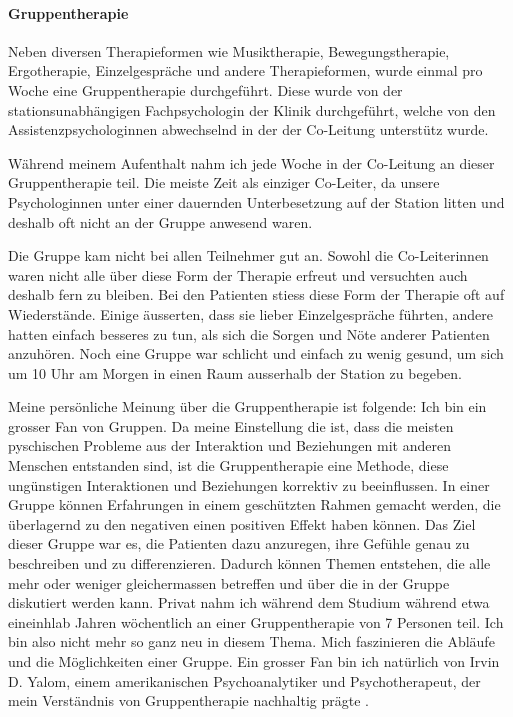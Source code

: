 \documentclass[jou,apacite]{apa6}
\begin{document}
\paragraph{Gruppentherapie}
Neben diversen Therapieformen wie Musiktherapie, Bewegungstherapie, Ergotherapie, Einzelgespräche und andere Therapieformen, wurde einmal pro Woche eine Gruppentherapie durchgeführt. Diese wurde von der stationsunabhängigen Fachpsychologin der Klinik durchgeführt, welche von den Assistenzpsychologinnen abwechselnd in der der Co-Leitung unterstütz wurde. 

Während meinem Aufenthalt nahm ich jede Woche in der Co-Leitung an dieser Gruppentherapie teil. Die meiste Zeit als einziger Co-Leiter, da unsere Psychologinnen unter einer dauernden Unterbesetzung auf der Station litten und deshalb oft nicht an der Gruppe anwesend waren. 

Die Gruppe kam nicht bei allen Teilnehmer gut an. Sowohl die Co-Leiterinnen waren nicht alle über diese Form der Therapie erfreut und versuchten auch deshalb fern zu bleiben. Bei den Patienten stiess diese Form der Therapie oft auf Wiederstände. Einige äusserten, dass sie lieber Einzelgespräche führten, andere hatten einfach besseres zu tun, als sich die Sorgen und Nöte anderer Patienten anzuhören. Noch eine Gruppe war schlicht und einfach zu wenig gesund, um sich um 10 Uhr am Morgen in einen Raum ausserhalb der Station zu begeben.

Meine persönliche Meinung über die Gruppentherapie ist folgende: Ich bin ein grosser Fan von Gruppen. Da meine Einstellung die ist, dass die meisten pyschischen Probleme aus der Interaktion und Beziehungen mit anderen Menschen entstanden sind, ist die Gruppentherapie eine Methode, diese ungünstigen Interaktionen und Beziehungen korrektiv zu beeinflussen. In einer Gruppe können Erfahrungen in einem geschützten Rahmen gemacht werden, die überlagernd zu den negativen einen positiven Effekt haben können. Das Ziel dieser Gruppe war es, die Patienten dazu anzuregen, ihre Gefühle genau zu beschreiben und zu differenzieren. Dadurch können Themen entstehen, die alle mehr oder weniger gleichermassen betreffen und über die in der Gruppe diskutiert werden kann. Privat nahm ich während dem Studium während etwa eineinhlab Jahren wöchentlich an einer Gruppentherapie von 7 Personen teil. Ich bin also nicht mehr so ganz neu in diesem Thema. Mich faszinieren die Abläufe und die Möglichkeiten einer Gruppe. Ein grosser Fan bin ich natürlich von Irvin D. Yalom, einem amerikanischen Psychoanalytiker und Psychotherapeut, der mein Verständnis von Gruppentherapie nachhaltig prägte \cite{Yalom2010}.
\end{document}
